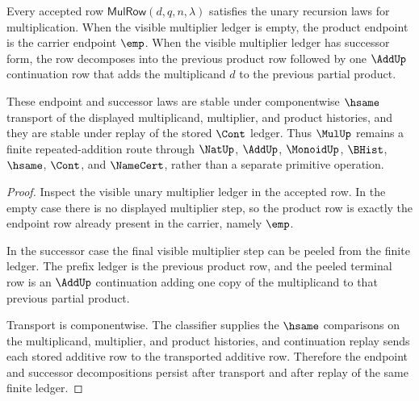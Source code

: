 \begin{theorem}
\label{thm:mul-unary-product-recursion-laws}
Every accepted row $\mathsf{MulRow}(d,q,n,\lambda)$ satisfies the unary recursion laws for multiplication. When the visible multiplier ledger is empty, the product endpoint is the carrier endpoint $\emp$. When the visible multiplier ledger has successor form, the row decomposes into the previous product row followed by one $\AddUp$ continuation row that adds the multiplicand $d$ to the previous partial product.

These endpoint and successor laws are stable under componentwise $\hsame$ transport of the displayed multiplicand, multiplier, and product histories, and they are stable under replay of the stored $\Cont$ ledger. Thus $\MulUp$ remains a finite repeated-addition route through $\NatUp$, $\AddUp$, $\MonoidUp$, $\BHist$, $\hsame$, $\Cont$, and $\NameCert$, rather than a separate primitive operation.
\end{theorem}
\begin{proof}
Inspect the visible unary multiplier ledger in the accepted row. In the empty case there is no displayed multiplier step, so the product row is exactly the endpoint row already present in the carrier, namely $\emp$.

In the successor case the final visible multiplier step can be peeled from the finite ledger. The prefix ledger is the previous product row, and the peeled terminal row is an $\AddUp$ continuation adding one copy of the multiplicand to that previous partial product.

Transport is componentwise. The classifier supplies the $\hsame$ comparisons on the multiplicand, multiplier, and product histories, and continuation replay sends each stored additive row to the transported additive row. Therefore the endpoint and successor decompositions persist after transport and after replay of the same finite ledger.
\end{proof}

